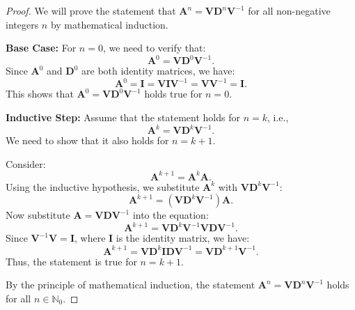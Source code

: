\documentclass[12pt,a4paper]{article}
\begin{document}
\begin{proof}
We will prove the statement that \(\mathbf{A}^n = \mathbf{V} \mathbf{D}^n \mathbf{V}^{-1}\) for all non-negative integers \(n\) by mathematical induction.

\textbf{Base Case:} For \(n = 0\), we need to verify that:
\[
\mathbf{A}^0 = \mathbf{V} \mathbf{D}^0 \mathbf{V}^{-1}.
\]
Since \(\mathbf{A}^0\) and \(\mathbf{D}^0\) are both identity matrices, we have:
\[
\mathbf{A}^0 = \mathbf{I} = \mathbf{V} \mathbf{I} \mathbf{V}^{-1} = \mathbf{V} \mathbf{V}^{-1} = \mathbf{I}.
\]
This shows that \(\mathbf{A}^0 = \mathbf{V} \mathbf{D}^0 \mathbf{V}^{-1}\) holds true for \(n = 0\).

\textbf{Inductive Step:} Assume that the statement holds for \(n = k\), i.e.,
\[
\mathbf{A}^k = \mathbf{V} \mathbf{D}^k \mathbf{V}^{-1}.
\]
We need to show that it also holds for \(n = k+1\).

Consider:
\[
\mathbf{A}^{k+1} = \mathbf{A}^k \mathbf{A}.
\]
Using the inductive hypothesis, we substitute \(\mathbf{A}^k\) with \(\mathbf{V} \mathbf{D}^k \mathbf{V}^{-1}\):
\[
\mathbf{A}^{k+1} = (\mathbf{V} \mathbf{D}^k \mathbf{V}^{-1}) \mathbf{A}.
\]
Now substitute \(\mathbf{A} = \mathbf{V} \mathbf{D} \mathbf{V}^{-1}\) into the equation:
\[
\mathbf{A}^{k+1} = \mathbf{V} \mathbf{D}^k \mathbf{V}^{-1} \mathbf{V} \mathbf{D} \mathbf{V}^{-1}.
\]
Since \(\mathbf{V}^{-1} \mathbf{V} = \mathbf{I}\), where \(\mathbf{I}\) is the identity matrix, we have:
\[
\mathbf{A}^{k+1} = \mathbf{V} \mathbf{D}^k \mathbf{I} \mathbf{D} \mathbf{V}^{-1} = \mathbf{V} \mathbf{D}^{k+1} \mathbf{V}^{-1}.
\]
Thus, the statement is true for \(n = k+1\).

By the principle of mathematical induction, the statement \(\mathbf{A}^n = \mathbf{V} \mathbf{D}^n \mathbf{V}^{-1}\) holds for all \(n \in \mathbb{N}_0\).
\end{proof}
\end{document}
